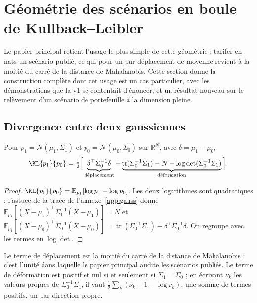 
\section{Géométrie des scénarios en boule de Kullback--Leibler}
\label{sec:stress}

Le papier principal retient l'usage le plus simple de cette géométrie : tarifer
en nats un scénario publié, ce qui pour un pur déplacement de moyenne revient à
la moitié du carré de la distance de Mahalanobis. Cette section donne la
construction complète dont cet usage est un cas particulier, avec les
démonstrations que la v1 se contentait d'énoncer, et un résultat nouveau sur le
relèvement d'un scénario de portefeuille à la dimension pleine.

\subsection{Divergence entre deux gaussiennes}

\begin{proposition}
\label{prop:klgauss}
Pour $p_1=\mathcal N(\mu_1,\Sigma_1)$ et $p_0=\mathcal N(\mu_0,\Sigma_0)$ sur
$\mathbb R^N$, avec $\delta=\mu_1-\mu_0$,
\begin{equation}
\label{eq:klgauss}
\KL{p_1}{p_0}=\tfrac12\Big[\underbrace{\delta^\top\Sigma_0^{-1}\delta}_{\text{déplacement}}
+\underbrace{\operatorname{tr}(\Sigma_0^{-1}\Sigma_1)-N-\log\det(\Sigma_0^{-1}\Sigma_1)}_{\text{déformation}}\Big].
\end{equation}
\end{proposition}

\begin{proof}
$\KL{p_1}{p_0}=\mathbb E_{p_1}[\log p_1-\log p_0]$. Les deux logarithmes sont
quadratiques ; l'astuce de la trace de l'annexe~\ref{app:gauss} donne
$\mathbb E_{p_1}[(X-\mu_1)^\top\Sigma_1^{-1}(X-\mu_1)]=N$ et
$\mathbb E_{p_1}[(X-\mu_0)^\top\Sigma_0^{-1}(X-\mu_0)]
=\operatorname{tr}(\Sigma_0^{-1}\Sigma_1)+\delta^\top\Sigma_0^{-1}\delta$. On
regroupe avec les termes en $\log\det$.
\end{proof}

Le terme de déplacement est la moitié du carré de la distance de Mahalanobis :
c'est l'unité dans laquelle le papier principal audite les scénarios
publiés. Le terme de déformation est positif et nul si et seulement si
$\Sigma_1=\Sigma_0$ ; en écrivant $\nu_k$ les valeurs propres de
$\Sigma_0^{-1}\Sigma_1$, il vaut $\tfrac12\sum_k(\nu_k-1-\log\nu_k)$, une somme de
termes positifs, un par direction propre.

